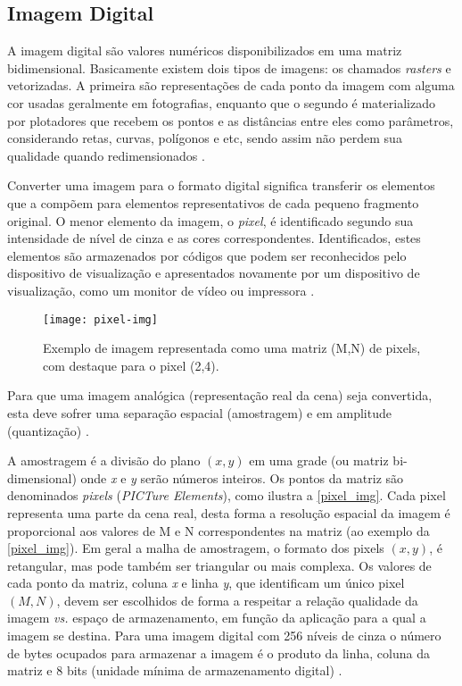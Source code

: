 \subsection{Imagem Digital}\label{subsec:imagem}

A imagem digital são valores numéricos disponibilizados em uma matriz bidimensional. Basicamente existem dois tipos de imagens: os chamados \textit{rasters} e vetorizadas. A primeira são representações de cada ponto da imagem com alguma cor usadas geralmente em fotografias, enquanto que o segundo é materializado por plotadores que recebem os pontos e as distâncias entre eles como parâmetros, considerando retas, curvas, polígonos e etc, sendo assim não perdem sua qualidade quando redimensionados \cite{img-digital-willians}.

Converter uma imagem para o formato digital significa transferir os elementos que a compõem para elementos representativos de cada pequeno fragmento original. O menor elemento da imagem, o \textit{pixel}, é identificado segundo sua intensidade de nível de cinza e as cores correspondentes. Identificados, estes elementos são armazenados por códigos que podem ser reconhecidos pelo dispositivo de visualização e apresentados novamente por um dispositivo de visualização, como um monitor de vídeo ou impressora \cite{img-digital-willians}. 

\begin{figure}[h]
	\centering
	\texttt{[image: pixel-img]}
	\caption{Exemplo de imagem representada como uma matriz (M,N) de pixels, com destaque para o pixel (2,4).}
	\label{pixel_img}
\end{figure}


Para que uma imagem analógica (representação real da cena) seja convertida, esta deve sofrer uma separação espacial (amostragem) e em amplitude (quantização) \cite{img-digital-willians}. 

A amostragem é a divisão do plano $(x,y)$ em uma grade (ou matriz bi-dimensional) onde \textit{x} e \textit{y} serão números inteiros. Os pontos da matriz são denominados \textit{pixels} (\textit{PICTure Elements}), como ilustra a \autoref{pixel_img}. Cada pixel representa uma parte da cena real, desta forma a resolução espacial da imagem é proporcional aos valores de M e N correspondentes na matriz (ao exemplo da \autoref{pixel_img}). Em geral a malha de amostragem, o formato dos pixels $(x,y)$, é retangular, mas pode também ser triangular ou mais complexa. Os valores de cada ponto da matriz, coluna \textit{x} e linha \textit{y}, que identificam um único pixel $(M,N)$, devem ser escolhidos de forma a respeitar a relação qualidade da imagem \textit{vs.} espaço de armazenamento, em função da aplicação para a qual a imagem se destina. Para uma imagem digital com 256 níveis de cinza o número de bytes ocupados para armazenar a imagem é o produto da linha, coluna da matriz e 8 bits (unidade mínima de armazenamento digital) \cite{img-digital-willians}. 

